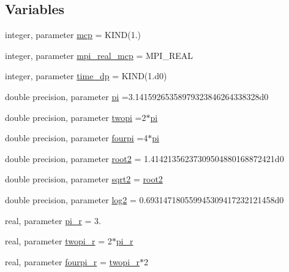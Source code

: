 \subsection*{Variables}
\begin{DoxyCompactItemize}
\item 
integer, parameter \mbox{\hyperlink{namespacesettings_a341fa0fe410054f78630c33e118669bf}{mcp}} = K\+I\+ND(1.)
\item 
integer, parameter \mbox{\hyperlink{namespacesettings_aa6d55f83efe636882451ee1240bf4929}{mpi\+\_\+real\+\_\+mcp}} = M\+P\+I\+\_\+\+R\+E\+AL
\item 
integer, parameter \mbox{\hyperlink{namespacesettings_a3d81f31b9e0eef8de19fb9b016043af7}{time\+\_\+dp}} = K\+I\+ND(1.d0)
\item 
double precision, parameter \mbox{\hyperlink{namespacesettings_a57710b73441b5ec0babcaa48cd333055}{pi}} =3.\+14159265358979323846264338328d0
\item 
double precision, parameter \mbox{\hyperlink{namespacesettings_a22fb9d779d16c940a845d5da795ef6ec}{twopi}} =2$\ast$\mbox{\hyperlink{namespacesettings_a57710b73441b5ec0babcaa48cd333055}{pi}}
\item 
double precision, parameter \mbox{\hyperlink{namespacesettings_ad4683f1ccdfb64cdf9aa5643ce991cd5}{fourpi}} =4$\ast$\mbox{\hyperlink{namespacesettings_a57710b73441b5ec0babcaa48cd333055}{pi}}
\item 
double precision, parameter \mbox{\hyperlink{namespacesettings_a54504c6d9151b9990bf3f15deeaa139b}{root2}} = 1.\+41421356237309504880168872421d0
\item 
double precision, parameter \mbox{\hyperlink{namespacesettings_a46452645879c3ed6edc6b31e79786d63}{sqrt2}} = \mbox{\hyperlink{namespacesettings_a54504c6d9151b9990bf3f15deeaa139b}{root2}}
\item 
double precision, parameter \mbox{\hyperlink{namespacesettings_a9020a6ca0bbe74043ff8103f9f8ece1d}{log2}} = 0.\+693147180559945309417232121458d0
\item 
real, parameter \mbox{\hyperlink{namespacesettings_a6fe3b2dcac06d9e51592e885f64ace1d}{pi\+\_\+r}} = 3.
\item 
real, parameter \mbox{\hyperlink{namespacesettings_a87b6f8cb970e358fc23b950e8db62257}{twopi\+\_\+r}} = 2$\ast$\mbox{\hyperlink{namespacesettings_a6fe3b2dcac06d9e51592e885f64ace1d}{pi\+\_\+r}}
\item 
real, parameter \mbox{\hyperlink{namespacesettings_a84f03a75cdf655bea4a1568443921c37}{fourpi\+\_\+r}} = \mbox{\hyperlink{namespacesettings_a87b6f8cb970e358fc23b950e8db62257}{twopi\+\_\+r}}$\ast$2

\end{DoxyCompactItemize}
